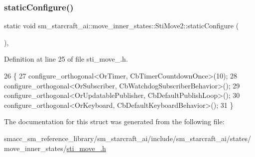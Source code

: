 \subsubsection{\texorpdfstring{static\+Configure()}{staticConfigure()}}
{\footnotesize\ttfamily static void sm\+\_\+starcraft\+\_\+ai\+::move\+\_\+inner\+\_\+states\+::\+Sti\+Move2\+::static\+Configure (\begin{DoxyParamCaption}{ }\end{DoxyParamCaption})\hspace{0.3cm}{\ttfamily [inline]}, {\ttfamily [static]}}



Definition at line 25 of file sti\+\_\+move\+\_.\+h.


\begin{DoxyCode}
26   \{
27     configure\_orthogonal<OrTimer, CbTimerCountdownOnce>(10);
28     configure\_orthogonal<OrSubscriber, CbWatchdogSubscriberBehavior>();
29     configure\_orthogonal<OrUpdatablePublisher, CbDefaultPublishLoop>();
30     configure\_orthogonal<OrKeyboard, CbDefaultKeyboardBehavior>();
31   \}
\end{DoxyCode}


The documentation for this struct was generated from the following file\+:\begin{DoxyCompactItemize}
\item 
smacc\+\_\+sm\+\_\+reference\+\_\+library/sm\+\_\+starcraft\+\_\+ai/include/sm\+\_\+starcraft\+\_\+ai/states/move\+\_\+inner\+\_\+states/\hyperlink{sti__move__2_8h}{sti\+\_\+move\+\_.\+h}\end{DoxyCompactItemize}
